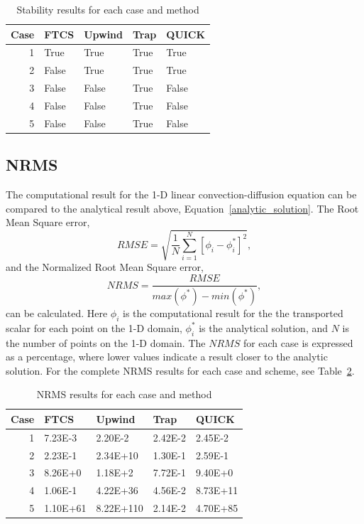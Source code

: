 \documentclass[twocolumn,10pt]{asme2ej}
\begin{document}
\begin{table}[tb]
\begin{center}
\begin{tabular}{|r | l l l l|}
\hline
Case & FTCS & Upwind & Trap & QUICK  \\
\hline
1 & True  & True  & True & True  \\
2 & False & True  & True & True  \\
3 & False & False & True & False \\
4 & False & False & True & False \\
5 & False & False & True & False \\
\hline
\end{tabular}
\caption{Stability results for each case and method}
\label{stability_table}
\end{center}
\end{table}

\subsection{NRMS}
The computational result for the 1-D linear convection-diffusion equation can be compared to the analytical result above, Equation~\ref{analytic_solution}. The Root Mean Square error,
\begin{equation}
RMSE = \sqrt{\frac{1}{N}\sum\limits_{i=1}^N[\phi_i - \phi^*_i]^2},
\end{equation}
and the Normalized Root Mean Square error,
\begin{equation}
NRMS = \dfrac{RMSE}{max(\phi^*)-min(\phi^*)},
\end{equation}
can be calculated. Here $\phi_i$ is the computational result for the the transported scalar for each point on the 1-D domain, $\phi^*_i$ is the analytical solution, and $N$ is the number of points on the 1-D domain. The $NRMS$ for each case is expressed as a percentage, where lower values indicate a result closer to the analytic solution. For the complete NRMS results for each case and scheme, see Table~\ref{rms_table}.

\begin{table}[tb]
\begin{center}
\begin{tabular}{|r | l l l l|}
\hline
Case & FTCS & Upwind & Trap & QUICK  \\
\hline
1 & 7.23E-3  & 2.20E-2   & 2.42E-2 & 2.45E-2  \\
2 & 2.23E-1  & 2.34E+10  & 1.30E-1 & 2.59E-1  \\
3 & 8.26E+0  & 1.18E+2   & 7.72E-1 & 9.40E+0  \\
4 & 1.06E-1  & 4.22E+36  & 4.56E-2 & 8.73E+11 \\
5 & 1.10E+61 & 8.22E+110 & 2.14E-2 & 4.70E+85 \\
\hline
\end{tabular}
\caption{NRMS results for each case and method}
\label{rms_table}
\end{center}
\end{table}
\end{document}
